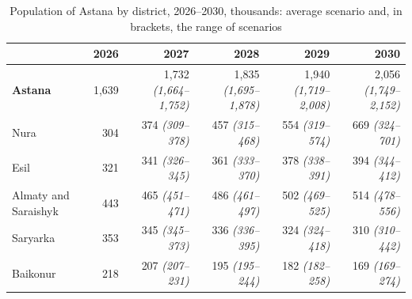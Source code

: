 \begin{table}[ht]
\centering
\caption{Population of Astana by district, 2026--2030, thousands: average scenario and, in brackets, the range of scenarios}
\label{tab:projection-total}
\footnotesize
\setlength{\tabcolsep}{3.5pt}
\begin{tabular}{lrrrrr}
\toprule
& 2026 & 2027 & 2028 & 2029 & 2030 \\
\midrule
\textbf{Astana} & 1,639 & 1,732 \textit{\scriptsize(1,664--1,752)} & 1,835 \textit{\scriptsize(1,695--1,878)} & 1,940 \textit{\scriptsize(1,719--2,008)} & 2,056 \textit{\scriptsize(1,749--2,152)} \\
\midrule
Nura & 304 & 374 \textit{\scriptsize(309--378)} & 457 \textit{\scriptsize(315--468)} & 554 \textit{\scriptsize(319--574)} & 669 \textit{\scriptsize(324--701)} \\
Esil & 321 & 341 \textit{\scriptsize(326--345)} & 361 \textit{\scriptsize(333--370)} & 378 \textit{\scriptsize(338--391)} & 394 \textit{\scriptsize(344--412)} \\
Almaty and Saraishyk & 443 & 465 \textit{\scriptsize(451--471)} & 486 \textit{\scriptsize(461--497)} & 502 \textit{\scriptsize(469--525)} & 514 \textit{\scriptsize(478--556)} \\
Saryarka & 353 & 345 \textit{\scriptsize(345--373)} & 336 \textit{\scriptsize(336--395)} & 324 \textit{\scriptsize(324--418)} & 310 \textit{\scriptsize(310--442)} \\
Baikonur & 218 & 207 \textit{\scriptsize(207--231)} & 195 \textit{\scriptsize(195--244)} & 182 \textit{\scriptsize(182--258)} & 169 \textit{\scriptsize(169--274)} \\
\bottomrule
\end{tabular}
\end{table}


